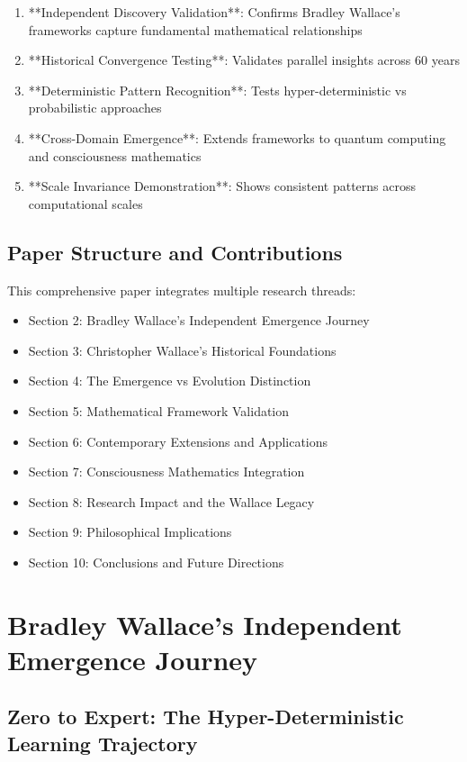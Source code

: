 \documentclass[12pt]{article}
\begin{document}
\begin{enumerate}
    \item **Independent Discovery Validation**: Confirms Bradley Wallace's frameworks capture fundamental mathematical relationships
    \item **Historical Convergence Testing**: Validates parallel insights across 60 years
    \item **Deterministic Pattern Recognition**: Tests hyper-deterministic vs probabilistic approaches
    \item **Cross-Domain Emergence**: Extends frameworks to quantum computing and consciousness mathematics
    \item **Scale Invariance Demonstration**: Shows consistent patterns across computational scales
\end{enumerate}

\subsection{Paper Structure and Contributions}

This comprehensive paper integrates multiple research threads:

\begin{itemize}
    \item Section 2: Bradley Wallace's Independent Emergence Journey
    \item Section 3: Christopher Wallace's Historical Foundations
    \item Section 4: The Emergence vs Evolution Distinction
    \item Section 5: Mathematical Framework Validation
    \item Section 6: Contemporary Extensions and Applications
    \item Section 7: Consciousness Mathematics Integration
    \item Section 8: Research Impact and the Wallace Legacy
    \item Section 9: Philosophical Implications
    \item Section 10: Conclusions and Future Directions
\end{itemize}

\section{Bradley Wallace's Independent Emergence Journey}

\subsection{Zero to Expert: The Hyper-Deterministic Learning Trajectory}
\end{document}
